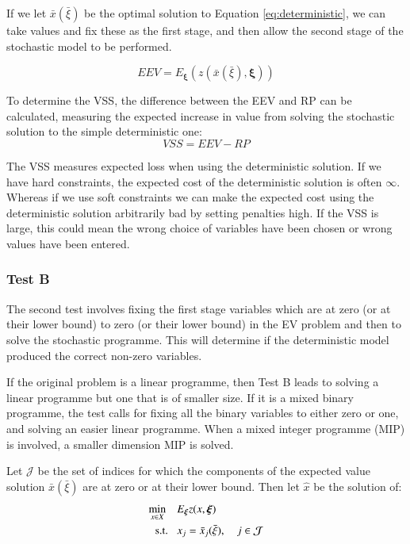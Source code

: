 \documentclass[../thesis.tex]{subfiles}
\begin{document}
{If we let $\bar x (\bar\xi)$ be the optimal solution to Equation \eqref{eq:deterministic}, we can take values and fix these as the first stage, and then allow the second stage of the stochastic model to be performed.

\begin{equation}\label{eq:EEV}
    EEV = E_{\boldsymbol{\xi}} (z(\bar x (\bar \xi),\boldsymbol{\xi}))
\end{equation}

To determine the VSS, the difference between the EEV and RP can be calculated, measuring the expected increase in value from solving the stochastic solution to the simple deterministic one:
\begin{equation}\label{eq:VSS}
    VSS = EEV - RP
\end{equation}

The VSS measures expected loss when using the deterministic solution. If we have hard constraints, the expected cost of the deterministic solution is often $\infty$. Whereas if we use soft constraints we can make the expected cost using the deterministic solution arbitrarily bad by setting penalties high. If the VSS is large, this could mean the wrong choice of variables have been chosen or wrong values have been entered.

\subsubsection{Test B}\label{sec:TestB}
The second test involves fixing the first stage variables which are at zero (or at their lower bound) to zero (or their lower bound) in the EV problem and then to solve the stochastic programme. This will determine if the deterministic model produced the correct non-zero variables.

If the original problem is a linear programme, then Test B leads to solving a linear programme but one that is of smaller size. If it is a mixed binary programme, the test calls for fixing all the binary variables to either zero or one, and solving an easier linear programme. When a mixed integer programme (MIP) is involved, a smaller dimension MIP is solved. 

Let $\mathcal{J}$ be the set of indices for which the components of the expected value solution $\bar x(\bar\xi)$ are at zero or at their lower bound. Then let $\hat x$ be the solution of:
\vspace{-.5cm}
\begin{align}
    \min_{x\in X}\enspace\enspace & E_{\boldsymbol{\xi}}z(x,\boldsymbol{\xi}) \notag\\
    \text{s.t. } \enspace & x_{j} =\bar x_{j}(\bar \xi), \enspace \enspace j \in \mathcal{J}
\end{align}

}
\end{document}
